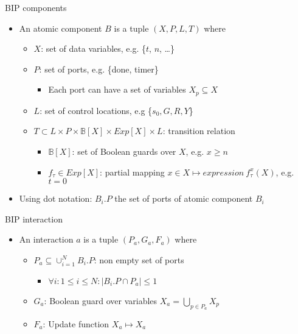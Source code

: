 \begin{frame}{BIP components}
\begin{itemize}
\item An atomic component $B$ is a tuple $\left(X,P,L,T\right)$ where 
\begin{itemize}
 \item $X$: set of data variables, e.g. \{$t$, $n$, \ldots\}
 \item $P$: set of ports, e.g. \{done, timer\}
 \begin{itemize}
  \item Each port can have a set of variables $X_p \subseteq X$
 \end{itemize}
 \item $L$: set of control locations, e.g \{$s_0, G, R, Y$\}
 \item $T \subset L \times P \times \mathbb{B}[X] \times Exp[X] \times L$: transition relation
 \begin{itemize}
  \item $\mathbb{B}[X]$: set of Boolean guards over $X$, e.g. $x \geq n$
  \item $f_\tau \in Exp[X]$: partial mapping $x \in X \mapsto expression~ f_\tau^{x}(X)$, e.g.
  $t = 0$
 \end{itemize}
\end{itemize}
\item Using dot notation: $B_i.P$ the set of ports of atomic component $B_i$
\end{itemize}
\end{frame}

\begin{frame}{BIP interaction}
\begin{itemize}
 \item An interaction $a$ is a tuple $(P_a, G_a, F_a)$ where
 \begin{itemize}
  \item $P_a \subseteq \cup_{i=1}^{N} B_i.P$: non empty set of ports 
  \begin{itemize}
   \item $\forall{i}:1 \leq i \leq N	: |B_i.P \cap P_a| \leq 1$
  \end{itemize}
  \item $G_a$: Boolean guard over variables $X_a = \bigcup_{p \in P_a} X_p$
  \item $F_a$: Update function $X_a \mapsto X_a$
 \end{itemize}
\end{itemize}
\end{frame}

